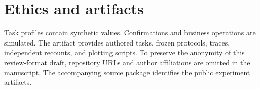 \documentclass[10pt,twocolumn]{article}
\begin{document}
\section*{Ethics and artifacts}
Task profiles contain synthetic values. Confirmations and business operations are simulated. The artifact provides authored tasks, frozen protocols, traces, independent recounts, and plotting scripts. To preserve the anonymity of this review-format draft, repository URLs and author affiliations are omitted in the manuscript. The accompanying source package identifies the public experiment artifacts.



\clearpage
\appendix


\end{document}
